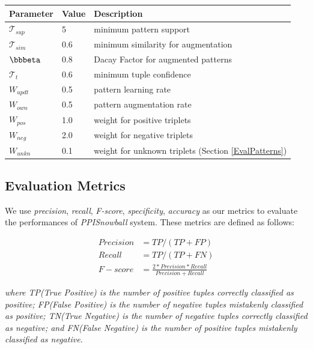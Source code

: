 \begin{table}
\begin{center}
\begin{tabular}{||l|l|l||}
\hline
Parameter &  Value  & Description \\
\hline
$\mathcal {T}_{sup}$ & 5 & minimum pattern support \\
$\mathcal {T}_{sim}$ &  0.6 &  minimum similarity for augmentation \\
$\bbbeta$ & 0.8 & Dacay Factor for augmented patterns  \\
$\mathcal {T}_{t}$ & 0.6 & minimum tuple confidence \\
$W_{updt}$ & 0.5 & pattern learning rate \\
$W_{own}$ & 0.5 & pattern augmentation rate \\
$W_{pos}$ & 1.0 & weight for positive triplets \\
$W_{neg}$ & 2.0 & weight for negative triplets \\ $W_{unkn}$ & 0.1 & weight for unknown triplets (Section \ref{EvalPatterns}) \\ \hline
\end{tabular}
\end{center}
\end{table}

\subsection{Evaluation Metrics}
\label{exp:EvalMet}

We use \emph{precision}, \emph{recall}, \emph{F-score}, \emph{specificity}, \emph{accuracy} as our metrics to evaluate the performances of \emph{PPISnowball} system. These metrics are defined as follows:

\begin{equation}
\begin{aligned}
Precision &= TP/(TP+FP)  \nonumber \\
Recall &= TP/(TP+FN)  \nonumber \\
F-score &= \frac{2*Precision*Recall}{Precision+Recall}
\end{aligned}
\end{equation}

\emph{where TP(True Positive) is the number of positive tuples correctly classified as positive; FP(False Positive) is the number of negative tuples mistakenly classified as positive; TN(True Negative) is the number of negative tuples correctly classified as negative; and FN(False Negative) is the number of positive tuples mistakenly classified as negative.} \\

